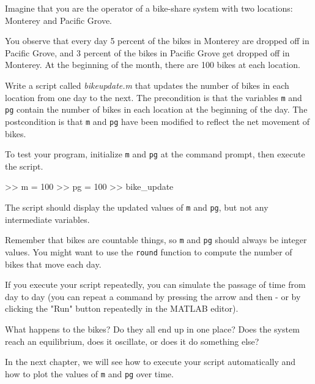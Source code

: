 \documentclass[../../book.tex]{subfiles}
\begin{document}
\begin{ex}
\label{bikegame}

Imagine that you are the operator of a bike-share system with two
locations: Monterey and Pacific Grove.

You observe that every day 5 percent
of the bikes in Monterey are dropped off in Pacific Grove, and 3 percent of the bikes
in Pacific Grove get dropped off in Monterey.
At the beginning of the month, there are 100 bikes at each location.

Write a script called \emph{bike\textunderscore update.m} that updates the number
of bikes in each location from one day to the next.  The precondition
is that the variables \lstinline{m} and \lstinline{pg} contain the number of bikes
in each location at the beginning of the day.  The postcondition
is that \lstinline{m} and \lstinline{pg} have been modified to reflect the net movement of bikes.

To test your program, initialize \lstinline{m} and \lstinline{pg} at
the command prompt, then execute the script.  
\begin{code}
>> m = 100
>> pg = 100
>> bike_update
\end{code}

The script should display
the updated values of \lstinline{m} and \lstinline{pg}, but not any intermediate
variables.

Remember that bikes are countable things, so \lstinline{m} and \lstinline{pg} should always be integer values.  You might want to use the \lstinline{round} function
to compute the number of bikes that move each day.

If you execute your script repeatedly, you can simulate the passage
of time from day to day (you can repeat a command by pressing the  arrow and then  - or by clicking the "Run" button repeatedly in the MATLAB editor).

What happens to the bikes?  Do they all end up in one place?  Does the system reach an equilibrium, does it oscillate, or does it do something else?

In the next chapter, we will see how to execute your script automatically
and how to plot the values of \lstinline{m} and \lstinline{pg} over time.

\end{ex}
\end{document}
